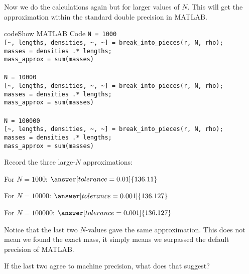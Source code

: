 \documentclass{ximera}
\begin{document}
Now we do the calculations again but for larger values of $N$. This will get the approximation within the standard double precision in MATLAB.

\begin{expandable}{code}{Show MATLAB Code}
\texttt{N = 1000}\\
\texttt{[\textasciitilde, lengths, densities, \textasciitilde, \textasciitilde] = break\_into\_pieces(r, N, rho);}\\
\texttt{masses = densities .* lengths;}\\
\texttt{mass\_approx = sum(masses)}\\
\\
\texttt{N = 10000}\\
\texttt{[\textasciitilde, lengths, densities, \textasciitilde, \textasciitilde] = break\_into\_pieces(r, N, rho);}\\
\texttt{masses = densities .* lengths;}\\
\texttt{mass\_approx = sum(masses)}\\
\\
\texttt{N = 100000}\\
\texttt{[\textasciitilde, lengths, densities, \textasciitilde, \textasciitilde] = break\_into\_pieces(r, N, rho);}\\
\texttt{masses = densities .* lengths;}\\
\texttt{mass\_approx = sum(masses)}
\end{expandable}

\begin{problem}
Record the three large-$N$ approximations:

For $N=1000$: $\answer[tolerance=0.01]{136.11}$

For $N=10000$: $\answer[tolerance=0.001]{136.127}$

For $N=100000$: $\answer[tolerance=0.001]{136.127}$

Notice that the last two $N$-values gave the same approximation. This does not mean we found the exact mass, it simply means we surpassed the default precision of MATLAB.

If the last two agree to machine precision, what does that suggest? \begin{multipleChoice}
\end{multipleChoice}
\end{problem}
\end{document}
